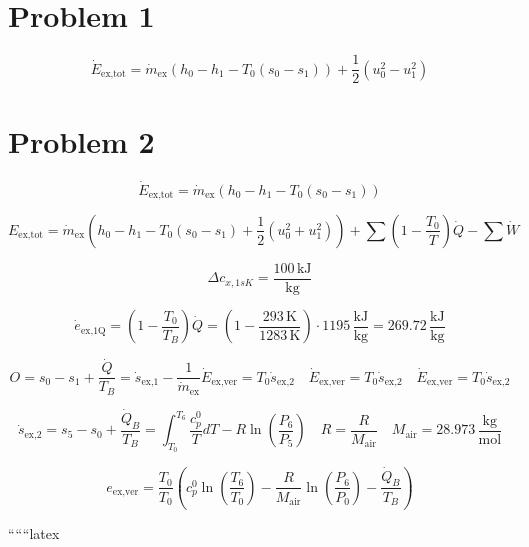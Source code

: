 \section*{Problem 1}

\[
\dot{E}_{\text{ex,tot}} = \dot{m}_{\text{ex}} (h_0 - h_1 - T_0 (s_0 - s_1)) + \frac{1}{2} (u_0^2 - u_1^2)
\]

\section*{Problem 2}

\[
\dot{E}_{\text{ex,tot}} = \dot{m}_{\text{ex}} (h_0 - h_1 - T_0 (s_0 - s_1))
\]

\[
E_{\text{ex,tot}} = \dot{m}_{\text{ex}} (h_0 - h_1 - T_0 (s_0 - s_1) + \frac{1}{2} (u_0^2 + u_1^2)) + \sum (1 - \frac{T_0}{T}) \dot{Q} - \sum \dot{W}
\]

\[
\Delta c_{x,1sK} = \frac{100 \, \text{kJ}}{\text{kg}}
\]

\[
\dot{e}_{\text{ex,1Q}} = (1 - \frac{T_0}{T_B}) \dot{Q} = (1 - \frac{293 \, \text{K}}{1283 \, \text{K}}) \cdot 1195 \, \frac{\text{kJ}}{\text{kg}} = 269.72 \, \frac{\text{kJ}}{\text{kg}}
\]

\[
O = s_0 - s_1 + \frac{\dot{Q}}{T_B} = \dot{s}_{\text{ex,1}} - \frac{1}{\dot{m}_{\text{ex}}} \dot{E}_{\text{ex,ver}} = T_0 \dot{s}_{\text{ex,2}} \quad \dot{E}_{\text{ex,ver}} = T_0 \dot{s}_{\text{ex,2}} \quad \dot{E}_{\text{ex,ver}} = T_0 \dot{s}_{\text{ex,2}}
\]

\[
\dot{s}_{\text{ex,2}} = s_5 - s_0 + \frac{\dot{Q}_B}{T_B} = \int_{T_0}^{T_6} \frac{c_p^0}{T} dT - R \ln \left( \frac{P_6}{P_5} \right) \quad R = \frac{R}{M_{\text{air}}} \quad M_{\text{air}} = 28.973 \, \frac{\text{kg}}{\text{mol}}
\]

\[
e_{\text{ex,ver}} = \frac{T_0}{T_0} (c_p^0 \ln \left( \frac{T_6}{T_0} \right) - \frac{R}{M_{\text{air}}} \ln \left( \frac{P_6}{P_0} \right) - \frac{\dot{Q}_B}{T_B})
\]

``````latex


